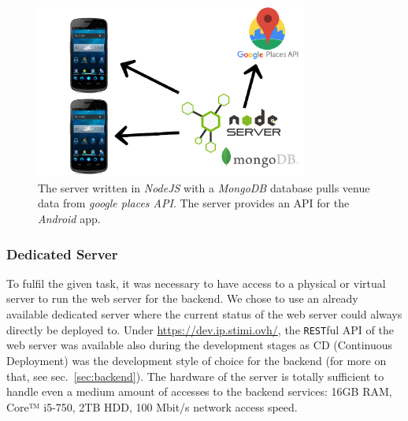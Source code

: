 \begin{figure}[htbp]
	\includegraphics[width=0.8\textwidth]{images/architecture.png}
	\centering
	\caption[Project architecture]{The server written in \textit{NodeJS} with a \textit{MongoDB} database pulls venue data from \textit{google places API}. The server provides an API for the \textit{Android} app.\footnotemark}
	\label{fig:archtecture}
\end{figure} 


\subsubsection{Dedicated Server}
\label{subsubsec:dedicatedserver}
To fulfil the given task, it was necessary to have access to a physical or virtual server to run the web server for the backend. We chose to use an already available dedicated server where the current status of the web server could always directly be deployed to. Under \url{https://dev.ip.stimi.ovh/}, the \texttt{REST}ful API of the web server was available also during the development stages as CD (Continuous Deployment) was the development style of choice for the backend (for more on that, see sec.\ \ref{sec:backend}). \newline
The hardware of the server is totally sufficient to handle even a medium amount of accesses to the backend services: 16GB RAM, Core™ i5-750, 2TB HDD, 100 Mbit/s network access speed.

